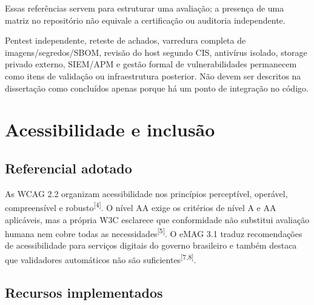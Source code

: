 \documentclass[11pt,a4paper]{article}
\newcommand{\sourcecite}[1]{\textsuperscript{[#1]}}
\begin{document}
Essas referências servem para estruturar uma avaliação; a presença de uma matriz no repositório não equivale a certificação ou auditoria independente.

\begin{limitbox}[title=Risco residual explicitamente registrado]
Pentest independente, reteste de achados, varredura completa de imagens/segredos/SBOM, revisão do host segundo CIS, antivírus isolado, storage privado externo, SIEM/APM e gestão formal de vulnerabilidades permanecem como itens de validação ou infraestrutura posterior. Não devem ser descritos na dissertação como concluídos apenas porque há um ponto de integração no código.
\end{limitbox}

\section{Acessibilidade e inclusão}

\subsection{Referencial adotado}

As WCAG 2.2 organizam acessibilidade nos princípios perceptível, operável, compreensível e robusto\sourcecite{4}. O nível AA exige os critérios de nível A e AA aplicáveis, mas a própria W3C esclarece que conformidade não substitui avaliação humana nem cobre todas as necessidades\sourcecite{5}. O eMAG 3.1 traduz recomendações de acessibilidade para serviços digitais do governo brasileiro e também destaca que validadores automáticos não são suficientes\sourcecite{7,8}.

\subsection{Recursos implementados}
\end{document}
